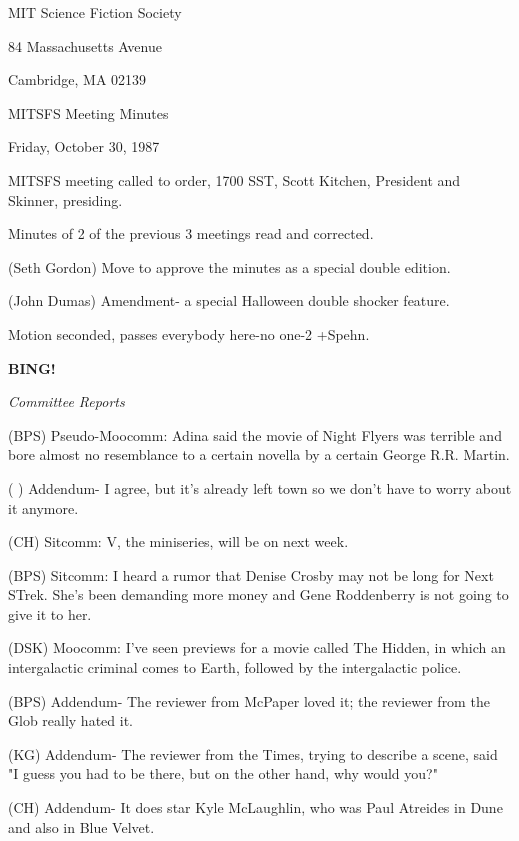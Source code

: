 \documentclass[12pt]{article}
\newcommand{\bing}{{\bf BING!} }
\newcommand{\goto}[1]{\bing \vskip 12pt \centerline{{\em{#1}}}}
\begin{document}
\begin{center}

MIT Science Fiction Society 

84 Massachusetts Avenue

Cambridge, MA 02139

\vspace{12pt}

MITSFS Meeting Minutes 

Friday, October 30, 1987

\end{center}
 
\vspace{18pt}

\setlength{\parskip}{6pt}

\noindent
MITSFS meeting called to order, 1700 SST,
Scott Kitchen, President and Skinner, presiding.

Minutes of 2 of the previous 3 meetings read and corrected.

(Seth Gordon) Move to approve the minutes as a special double edition.

(John Dumas) Amendment- a special Halloween double shocker feature.

Motion seconded, passes everybody here-no one-2 +Spehn.

\goto{Committee Reports}

(BPS) Pseudo-Moocomm: Adina said the movie of Night Flyers was terrible and bore almost no resemblance to a certain novella by a certain George R.R. Martin.

( ) Addendum- I agree, but it's already left town so we don't have to worry about it anymore.

(CH) Sitcomm: V, the miniseries, will be on next week.

(BPS) Sitcomm: I heard a rumor that Denise Crosby may not be long for Next STrek. She's been demanding more money and Gene Roddenberry is not going to give it to her.

(DSK) Moocomm: I've seen previews for a movie called The Hidden, in which an intergalactic criminal comes to Earth, followed by the intergalactic police.

(BPS) Addendum- The reviewer from McPaper loved it; the reviewer from the Glob really hated it.

(KG) Addendum- The reviewer from the Times, trying to describe a scene, said "I guess you had to be there, but on the other hand, why would you?"

(CH) Addendum- It does star Kyle McLaughlin, who was Paul Atreides in Dune and also in Blue Velvet.
\end{document}
